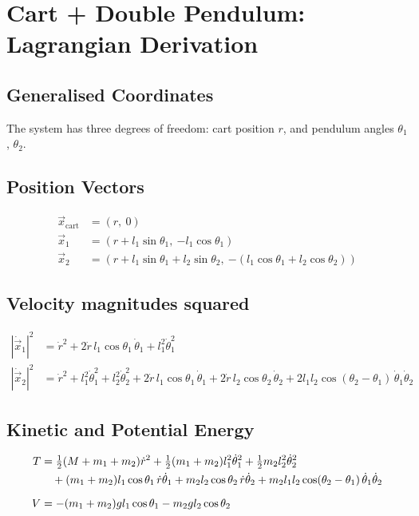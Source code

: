 \documentclass{article}
\begin{document}
\section*{Cart + Double Pendulum: Lagrangian Derivation}

\subsection*{Generalised Coordinates}
The system has three degrees of freedom: cart position $r$, and pendulum angles $\theta_1$, $\theta_2$.

\subsection*{Position Vectors}
\begin{align}
    \vec{x}_\text{cart} &= (r,\ 0) \\
    \vec{x}_1 &= (r + l_1\sin\theta_1,\ {-l_1\cos\theta_1}) \\
    \vec{x}_2 &= (r + l_1\sin\theta_1 + l_2\sin\theta_2,\ {-(l_1\cos\theta_1 + l_2\cos\theta_2)})
\end{align}

\subsection*{Velocity magnitudes squared}
\begin{align}
    |\dot{\vec{x}}_1|^2 &= \dot{r}^2 + 2\dot{r}\,l_1\cos\theta_1\,\dot{\theta}_1 + l_1^2\dot{\theta}_1^2 \\
    |\dot{\vec{x}}_2|^2 &= \dot{r}^2 + l_1^2\dot{\theta}_1^2 + l_2^2\dot{\theta}_2^2
        + 2\dot{r}\,l_1\cos\theta_1\,\dot{\theta}_1
        + 2\dot{r}\,l_2\cos\theta_2\,\dot{\theta}_2
        + 2l_1 l_2\cos(\theta_2-\theta_1)\,\dot{\theta}_1\dot{\theta}_2
\end{align}

\subsection*{Kinetic and Potential Energy}
\begin{align}
    T &= \tfrac{1}{2}(M+m_1+m_2)\dot{r}^2
       + \tfrac{1}{2}(m_1+m_2)l_1^2\dot{\theta}_1^2
       + \tfrac{1}{2}m_2 l_2^2\dot{\theta}_2^2 \notag \\
      &\quad + (m_1+m_2)l_1\cos\theta_1\,\dot{r}\dot{\theta}_1
       + m_2 l_2\cos\theta_2\,\dot{r}\dot{\theta}_2
       + m_2 l_1 l_2\cos(\theta_2-\theta_1)\,\dot{\theta}_1\dot{\theta}_2 \\[6pt]
    V &= -(m_1+m_2)g l_1\cos\theta_1 - m_2 g l_2\cos\theta_2
\end{align}
\end{document}
